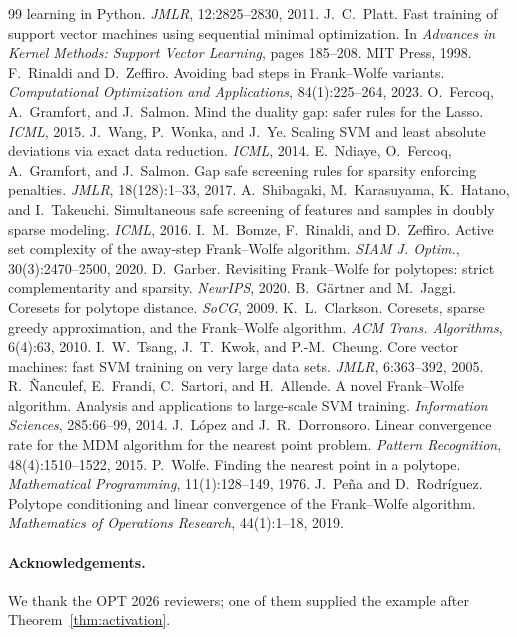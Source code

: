 \documentclass{opt2026}   %
\begin{document}
\begin{thebibliography}{99}
learning in {Python}. \emph{JMLR}, 12:2825--2830, 2011.
 J.~C.~Platt. Fast training of support vector
machines using sequential minimal optimization. In \emph{Advances in
Kernel Methods: Support Vector Learning}, pages 185--208. MIT Press, 1998.
 F.~Rinaldi and D.~Zeffiro. Avoiding bad steps in
Frank--Wolfe variants. \emph{Computational Optimization and
Applications}, 84(1):225--264, 2023.
 O.~Fercoq, A.~Gramfort, and J.~Salmon. Mind the
duality gap: safer rules for the Lasso. \emph{ICML}, 2015.
 J.~Wang, P.~Wonka, and J.~Ye. Scaling SVM and least
absolute deviations via exact data reduction. \emph{ICML}, 2014.
 E.~Ndiaye, O.~Fercoq, A.~Gramfort, and J.~Salmon.
Gap safe screening rules for sparsity enforcing penalties. \emph{JMLR},
18(128):1--33, 2017.
 A.~Shibagaki, M.~Karasuyama, K.~Hatano, and
I.~Takeuchi. Simultaneous safe screening of features and samples in
doubly sparse modeling. \emph{ICML}, 2016.
 I.~M.~Bomze, F.~Rinaldi, and D.~Zeffiro. Active set
complexity of the away-step Frank--Wolfe algorithm. \emph{SIAM J.
Optim.}, 30(3):2470--2500, 2020.
 D.~Garber. Revisiting Frank--Wolfe for polytopes:
strict complementarity and sparsity. \emph{NeurIPS}, 2020.
 B.~G\"artner and M.~Jaggi. Coresets for polytope
distance. \emph{SoCG}, 2009.
 K.~L.~Clarkson. Coresets, sparse greedy
approximation, and the Frank--Wolfe algorithm. \emph{ACM Trans.
Algorithms}, 6(4):63, 2010.
 I.~W.~Tsang, J.~T.~Kwok, and P.-M.~Cheung. Core
vector machines: fast SVM training on very large data sets. \emph{JMLR},
6:363--392, 2005.
 R.~\~Nanculef, E.~Frandi, C.~Sartori, and
H.~Allende. A novel Frank--Wolfe algorithm. Analysis and applications
to large-scale SVM training. \emph{Information Sciences}, 285:66--99,
2014.
 J.~L\'opez and J.~R.~Dorronsoro. Linear convergence
rate for the MDM algorithm for the nearest point problem.
\emph{Pattern Recognition}, 48(4):1510--1522, 2015.
 P.~Wolfe. Finding the nearest point in a polytope.
\emph{Mathematical Programming}, 11(1):128--149, 1976.
 J.~Pe\~na and D.~Rodr\'iguez. Polytope conditioning
and linear convergence of the Frank--Wolfe algorithm. \emph{Mathematics
of Operations Research}, 44(1):1--18, 2019.
\end{thebibliography}

\paragraph{Acknowledgements.} We thank the OPT 2026 reviewers; one of
them supplied the example after Theorem~\ref{thm:activation}.
\end{document}

